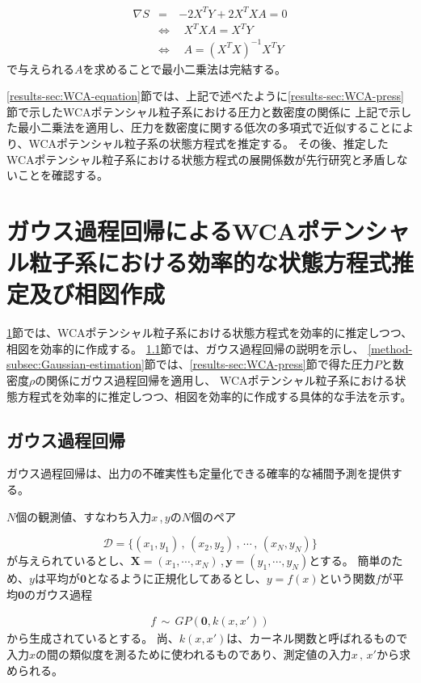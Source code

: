 \documentclass[titlepage]{jsreport}
\begin{document}
{{{\large
\begin{eqnarray}
    {\nabla}S&=&-2X^TY+2X^TXA=0\nonumber\\
    &{\Leftrightarrow}&{\ }{\ }X^TXA=X^TY\nonumber\\
    &{\Leftrightarrow}&{\ }{\ }A=(X^TX)^{-1}X^TY\label{eq:normal-equation}
\end{eqnarray}
\normalsize
で与えられる$A$を求めることで最小二乗法は完結する\cite{least-squares}。

\ref{results-sec:WCA-equation}節では、上記で述べたように\ref{results-sec:WCA-press}節で示したWCAポテンシャル粒子系における圧力と数密度の関係に
上記で示した最小二乗法を適用し、圧力を数密度に関する低次の多項式で近似することにより、WCAポテンシャル粒子系の状態方程式を推定する。
その後、推定したWCAポテンシャル粒子系における状態方程式の展開係数が先行研究と矛盾しないことを確認する。


\section{ガウス過程回帰によるWCAポテンシャル粒子系における効率的な状態方程式推定及び相図作成}\label{method-sec:Gauss}
\ref{method-sec:Gauss}節では、WCAポテンシャル粒子系における状態方程式を効率的に推定しつつ、相図を効率的に作成する。
\ref{method-subsec:Gauss}節では、ガウス過程回帰の説明を示し、
\ref{method-subsec:Gaussian-estimation}節では、\ref{results-sec:WCA-press}節で得た圧力$P$と数密度$\rho$の関係にガウス過程回帰を適用し、
WCAポテンシャル粒子系における状態方程式を効率的に推定しつつ、相図を効率的に作成する具体的な手法を示す。


\subsection{ガウス過程回帰}\label{method-subsec:Gauss}
ガウス過程回帰は、出力の不確実性も定量化できる確率的な補間予測を提供する\cite{machine-learning}。


$N$個の観測値、すなわち入力$x$\,,\,$y$の$N$個のペア

\large
\[
    \mathcal{D}=\{(x_1,y_1)\,,\,(x_2,y_2)\,,\,\cdots\,,\,(x_N,y_N)\}
\]
\normalsize
が与えられているとし、$\bm{X}=(x_1,\cdots,x_N)$\,,\,$\bm{y}=(y_1,\cdots,y_N)$とする。
簡単のため、$y$は平均が$\bm{0}$となるように正規化してあるとし、$y=f(x)$という関数$f$が平均$\bm{0}$のガウス過程

\large
\begin{eqnarray}
    f\,{\sim}\,GP(\bm{0},k(x,x'))\nonumber
\end{eqnarray}
\normalsize
から生成されているとする。
尚、$k(x,x')$は、カーネル関数と呼ばれるもので入力$x$の間の類似度を測るために使われるものであり\cite{Gauss-machine-learning}、測定値の入力$x\,,\,x'$から求められる。

}}}
\end{document}
